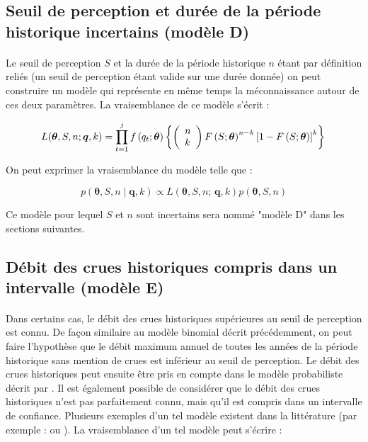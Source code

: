 \documentclass[11pt]{article}
\begin{document}
	\subsection{Seuil de perception et durée de la période historique incertains (modèle D)}
	\label{subsec:modD}	
	
	\paragraph{}
	Le seuil de perception $S$ et la durée de la période historique $n$ étant par définition reliés (un seuil de perception étant valide sur une durée donnée) on peut construire un modèle qui représente en même temps la méconnaissance autour de ces deux paramètres. La vraisemblance de ce modèle s'écrit :  
	
					\begin{equation}
			L(\boldsymbol{\theta}, S, n ; \boldsymbol{q}, k) = \prod_{t=1}^j f\left(q_t;\boldsymbol{\theta}\right) \left\{\left(\begin{array}{l}
			n \\
			k
			\end{array}\right) F\left(S;\boldsymbol{\theta}\right)^{n-k}\left[1-F\left(S;\boldsymbol{\theta}\right)\right]^k\right\} \\
			\label{eq:Gev_Binom_SN}
			\end{equation}
		
		On peut exprimer la vraisemblance du modèle telle que :
					
			\begin{equation}
				p(\boldsymbol{\theta}, S, n \mid \boldsymbol{q},k) \propto L(\boldsymbol{\theta},S, n;\,\boldsymbol{q},k) p(\boldsymbol{\theta},S, n)
				\label{eq:Bayes_uSN}
			\end{equation}

	Ce modèle pour lequel $S$ et $n$ sont incertains sera nommé "modèle D" dans les sections suivantes. 
	
	\subsection{Débit des crues historiques compris dans un intervalle (modèle E)}
	\label{subsec:modE}	
		
	\paragraph{} Dans certains cas, le débit des crues historiques supérieures au seuil de perception est connu. De façon similaire au modèle binomial décrit précédemment, on peut faire l'hypothèse que le débit maximum annuel de toutes les années de la période historique sans mention de crues est inférieur au seuil de perception. Le débit des crues historiques peut ensuite être pris en compte dans le modèle probabiliste décrit par \citet{stedinger_flood_1986}. Il est également possible de considérer que le débit des crues historiques n'est pas parfaitement connu, mais qu'il est compris dans un intervalle de confiance. Plusieurs exemples d'un tel modèle existent dans la littérature (par exemple : \citet{payrastre_usefulness_2011} ou \citet{parkes_defining_2016}). La vraisemblance d'un tel modèle peut s'écrire : 
\end{document}
